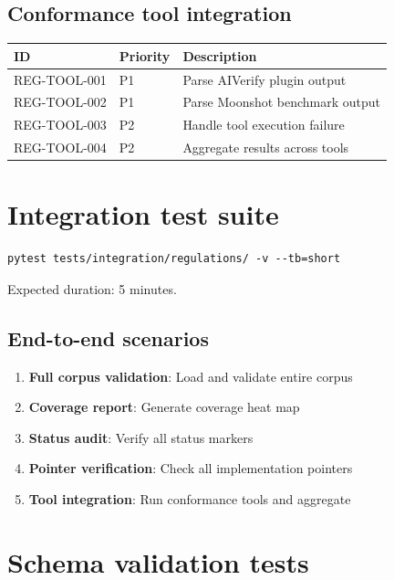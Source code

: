 \documentclass[11pt,a4paper,twoside]{report}
\begin{document}
\subsection{Conformance tool integration}

\begin{tabularx}{\linewidth}{@{}l l X@{}}
\toprule
\textbf{ID} & \textbf{Priority} & \textbf{Description} \\ \midrule
REG-TOOL-001 & P1 & Parse AIVerify plugin output \\
REG-TOOL-002 & P1 & Parse Moonshot benchmark output \\
REG-TOOL-003 & P2 & Handle tool execution failure \\
REG-TOOL-004 & P2 & Aggregate results across tools \\
\bottomrule
\end{tabularx}

\section{Integration test suite}

\begin{lstlisting}[basicstyle=\ttfamily\small]
pytest tests/integration/regulations/ -v --tb=short
\end{lstlisting}

Expected duration: 5 minutes.

\subsection{End-to-end scenarios}

\begin{enumerate}
\item \textbf{Full corpus validation}: Load and validate entire corpus
\item \textbf{Coverage report}: Generate coverage heat map
\item \textbf{Status audit}: Verify all status markers
\item \textbf{Pointer verification}: Check all implementation pointers
\item \textbf{Tool integration}: Run conformance tools and aggregate
\end{enumerate}

\section{Schema validation tests}
\end{document}
